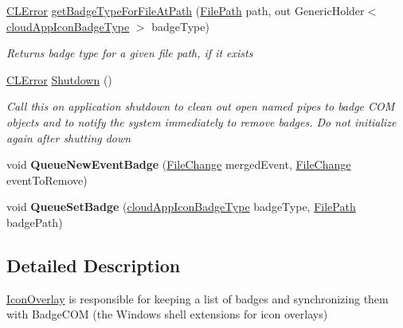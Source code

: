 \begin{DoxyCompactItemize}
\hyperlink{class_cloud_api_public_1_1_model_1_1_c_l_error}{C\-L\-Error} \hyperlink{class_cloud_api_public_1_1_badge_n_e_t_1_1_icon_overlay_a31895670b2c9fbfcfbf238ccd4830543}{get\-Badge\-Type\-For\-File\-At\-Path} (\hyperlink{class_cloud_api_public_1_1_model_1_1_file_path}{File\-Path} path, out Generic\-Holder$<$ \hyperlink{namespace_cloud_api_public_1_1_badge_n_e_t_afab91a750338fef6bd4ef08f5381c4e4}{cloud\-App\-Icon\-Badge\-Type} $>$ badge\-Type)
\begin{DoxyCompactList}\small\item\em Returns badge type for a given file path, if it exists \end{DoxyCompactList}\item 
\hyperlink{class_cloud_api_public_1_1_model_1_1_c_l_error}{C\-L\-Error} \hyperlink{class_cloud_api_public_1_1_badge_n_e_t_1_1_icon_overlay_a9195068db0a37db30907997f6a923977}{Shutdown} ()
\begin{DoxyCompactList}\small\item\em Call this on application shutdown to clean out open named pipes to badge C\-O\-M objects and to notify the system immediately to remove badges. Do not initialize again after shutting down \end{DoxyCompactList}\item 
\hypertarget{class_cloud_api_public_1_1_badge_n_e_t_1_1_icon_overlay_a9e3d9ea67058948f93f5011cc3960f5b}{void {\bfseries Queue\-New\-Event\-Badge} (\hyperlink{class_cloud_api_public_1_1_model_1_1_file_change}{File\-Change} merged\-Event, \hyperlink{class_cloud_api_public_1_1_model_1_1_file_change}{File\-Change} event\-To\-Remove)}\label{class_cloud_api_public_1_1_badge_n_e_t_1_1_icon_overlay_a9e3d9ea67058948f93f5011cc3960f5b}

\item 
\hypertarget{class_cloud_api_public_1_1_badge_n_e_t_1_1_icon_overlay_a302d830df650dd172d99772f9b4f479b}{void {\bfseries Queue\-Set\-Badge} (\hyperlink{namespace_cloud_api_public_1_1_badge_n_e_t_afab91a750338fef6bd4ef08f5381c4e4}{cloud\-App\-Icon\-Badge\-Type} badge\-Type, \hyperlink{class_cloud_api_public_1_1_model_1_1_file_path}{File\-Path} badge\-Path)}\label{class_cloud_api_public_1_1_badge_n_e_t_1_1_icon_overlay_a302d830df650dd172d99772f9b4f479b}

\end{DoxyCompactItemize}


\subsection{Detailed Description}
\hyperlink{class_cloud_api_public_1_1_badge_n_e_t_1_1_icon_overlay}{Icon\-Overlay} is responsible for keeping a list of badges and synchronizing them with Badge\-C\-O\-M (the Windows shell extensions for icon overlays) 



